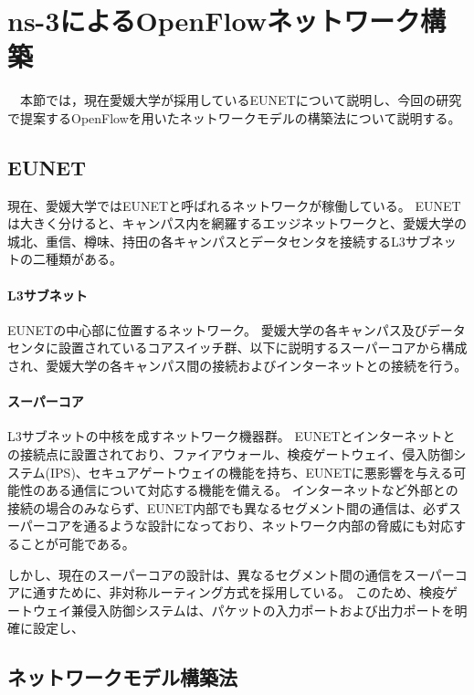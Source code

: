 \chapter{ns-3によるOpenFlowネットワーク構築}

　本節では，現在愛媛大学が採用しているEUNETについて説明し、今回の研究で提案するOpenFlowを用いたネットワークモデルの構築法について説明する。

\section{EUNET}

現在、愛媛大学ではEUNETと呼ばれるネットワークが稼働している。
EUNETは大きく分けると、キャンパス内を網羅するエッジネットワークと、愛媛大学の城北、重信、樽味、持田の各キャンパスとデータセンタを接続するL3サブネットの二種類がある。

\subsubsection{L3サブネット}

EUNETの中心部に位置するネットワーク。
愛媛大学の各キャンパス及びデータセンタに設置されているコアスイッチ群、以下に説明するスーパーコアから構成され、愛媛大学の各キャンパス間の接続およびインターネットとの接続を行う。

\subsubsection{スーパーコア}

L3サブネットの中核を成すネットワーク機器群。
EUNETとインターネットとの接続点に設置されており、ファイアウォール、検疫ゲートウェイ、侵入防御システム(IPS)、セキュアゲートウェイの機能を持ち、EUNETに悪影響を与える可能性のある通信について対応する機能を備える。
インターネットなど外部との接続の場合のみならず、EUNET内部でも異なるセグメント間の通信は、必ずスーパーコアを通るような設計になっており、ネットワーク内部の脅威にも対応することが可能である。

しかし、現在のスーパーコアの設計は、異なるセグメント間の通信をスーパーコアに通すために、非対称ルーティング方式を採用している。
このため、検疫ゲートウェイ兼侵入防御システムは、パケットの入力ポートおよび出力ポートを明確に設定し、

\section{ネットワークモデル構築法}

